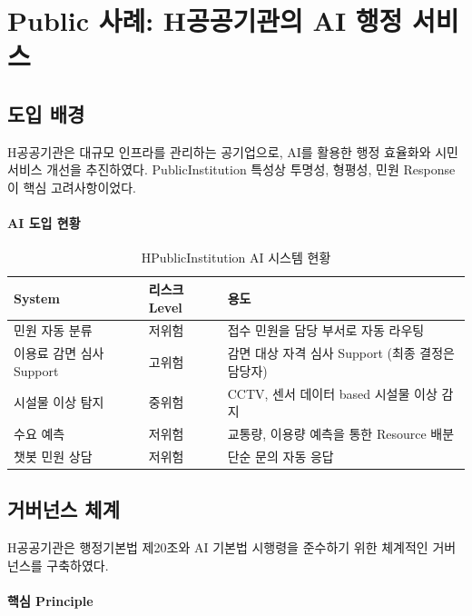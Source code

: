 \section{Public 사례: H공공기관의 AI 행정 서비스}
\label{sec:7.3}

\subsection{도입 배경}
\label{sec:7.3.1}

H공공기관은 대규모 인프라를 관리하는 공기업으로, 
AI를 활용한 행정 효율화와 시민 서비스 개선을 추진하였다. 
PublicInstitution 특성상 투명성, 형평성, 민원 Response이 핵심 고려사항이었다.

\paragraph{AI 도입 현황}

\begin{table}[htbp]
\centering
\caption{HPublicInstitution AI 시스템 현황}
\label{tab:public_ai_inventory}
\begin{tabularx}{\textwidth}{p{3cm}p{2cm}X}
\toprule
\textbf{System} & \textbf{리스크 Level} & \textbf{용도} \\
\midrule
민원 자동 분류 & 저위험 & 접수 민원을 담당 부서로 자동 라우팅 \\
\midrule
이용료 감면 심사 Support & 고위험 & 감면 대상 자격 심사 Support (최종 결정은 담당자) \\
\midrule
시설물 이상 탐지 & 중위험 & CCTV, 센서 데이터 based 시설물 이상 감지 \\
\midrule
수요 예측 & 저위험 & 교통량, 이용량 예측을 통한 Resource 배분 \\
\midrule
챗봇 민원 상담 & 저위험 & 단순 문의 자동 응답 \\
\bottomrule
\end{tabularx}
\end{table}


\subsection{거버넌스 체계}
\label{sec:7.3.2}

H공공기관은 행정기본법 제20조와 AI 기본법\cite{cset2025korea_ai_act} 시행령을 준수하기 위한 
체계적인 거버넌스를 구축하였다.

\paragraph{핵심 Principle}

